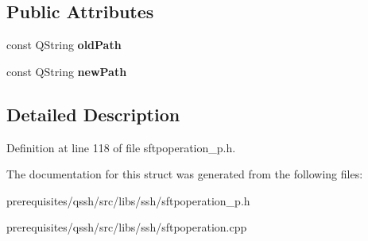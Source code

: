 \subsection*{Public Attributes}
\begin{DoxyCompactItemize}
\item 
\mbox{\label{struct_q_ssh_1_1_internal_1_1_sftp_rename_a8bd9ff5f974ef951070afbedb1017513}} 
const Q\+String {\bfseries old\+Path}
\item 
\mbox{\label{struct_q_ssh_1_1_internal_1_1_sftp_rename_a0421bdae3b45b4288448cf5e94e5c674}} 
const Q\+String {\bfseries new\+Path}
\end{DoxyCompactItemize}


\subsection{Detailed Description}


Definition at line 118 of file sftpoperation\+\_\+p.\+h.



The documentation for this struct was generated from the following files\+:\begin{DoxyCompactItemize}
\item 
prerequisites/qssh/src/libs/ssh/sftpoperation\+\_\+p.\+h\item 
prerequisites/qssh/src/libs/ssh/sftpoperation.\+cpp\end{DoxyCompactItemize}

